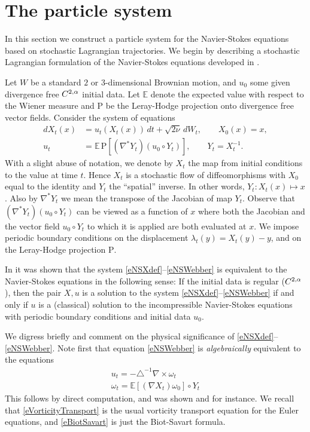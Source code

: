 \documentclass[final]{amsart}%
\newcommand{\slns}{\eqref{eNSXdef}--\eqref{eNSWebber}\xspace}
\newcommand{\lap}{\triangle}
\newcommand{\inv}{^{-1}}
\newcommand{\transpose}{^*}
\newcommand{\grad}{\nabla}
\newcommand{\gradt}{\grad\transpose}
\newcommand{\curl}{\grad \times}
\newcommand{\E}{\mathbb{E}}
\newcommand{\lhp}{\boldsymbol{\mathrm{P}}}
\newcommand{\holderspace}[2]{\ensuremath{C^{\ifx0#1{#2}\else{#1,#2}\fi}}}
\numberwithin{equation}{section}
\theoremstyle{definition}
\theoremstyle{remark}
\begin{document}
\section{The particle system}\label{sParticleSystem}%

In this section we construct a particle system for the Navier-Stokes
equations based on stochastic Lagrangian trajectories. We begin by
describing a stochastic Lagrangian formulation of the Navier-Stokes
equations developed in \cites{thesis,detsns}.

Let $W$ be a standard $2$ or $3$-dimensional Brownian motion, and
$u_0$ some given divergence free $\holderspace{2}{\alpha}$ initial
data. Let $\E$ denote the expected value with respect to the Wiener
measure and $\lhp$ be the Leray-Hodge projection onto divergence free
vector fields. Consider the system of equations
\begin{align}
  \label{eNSXdef} dX_t(x) &= u_t ( X_t(x) ) \, dt + \sqrt{2\nu}\,dW_t, \qquad X_0(x) = x,\\
  \label{eNSWebber} u_t &= \E\, \lhp\left[ (\gradt Y_t) (u_0 \circ Y_t)
  \right],\qquad Y_t = X_t\inv.
\end{align}
With a slight abuse of notation, we denote by $X_t$ the map from
initial conditions to the value at time $t$. Hence $X_t$ is a
stochastic flow of diffeomorphisms with $X_0$ equal to the identity
and $Y_t$ the ``spatial'' inverse. In other words, $Y_t\colon
X_t(x)\mapsto x$. Also by $\gradt Y_t$ we mean the transpose of the
Jacobian of map $Y_t$.  Observe that $(\gradt Y_t) (u_0 \circ Y_t)$
can be viewed as a function of $x$ where both the Jacobian and the
vector field $u_0 \circ Y_t$ to which it is applied are both evaluated
at $x$.  We impose periodic boundary conditions on the displacement
$\lambda_t(y) = X_t(y) - y$, and on the Leray-Hodge projection $\lhp$.


In \cites{thesis,detsns} it was shown that the system \slns is
equivalent to the Navier-Stokes equations in the following sense: If
the initial data is regular ($\holderspace{2}{\alpha}$), then the pair
$X,u$ is a solution to the system \slns if and only if $u$ is a
(classical) solution to the incompressible Navier-Stokes equations
with periodic boundary conditions and initial data $u_0$.

We digress briefly and comment on the physical significance of
\slns. Note first that equation \eqref{eNSWebber} is
\textit{algebraically} equivalent to the equations
\begin{gather}
\label{eBiotSavart} u_t = - \lap\inv \curl \omega_t\\
\label{eVorticityTransport} \omega_t = \E \left[ (\grad X_t) \omega_0 \right] \circ Y_t
\end{gather}
This follows by direct computation, and was shown \cite{ele} and
\cite{detsns} for instance. We recall that \eqref{eVorticityTransport}
is the usual vorticity transport equation for the Euler equations, and
\eqref{eBiotSavart} is just the Biot-Savart formula.
\end{document}
